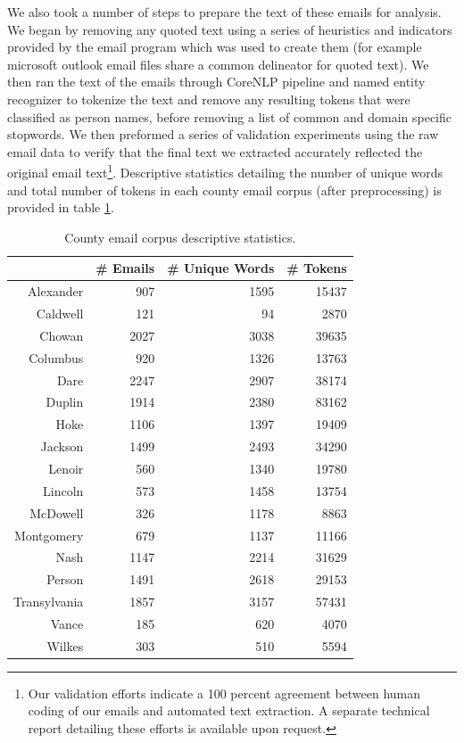 \documentclass{pnastwo}
\begin{document}
\begin{article}
We also took a number of steps to prepare the text of these emails for analysis. We began by removing any quoted text using a series of heuristics and indicators provided by the email program which was used to create them (for example microsoft outlook email files share a common delineator for quoted text). We then ran the text of the emails through CoreNLP pipeline and named entity recognizer \cite{manningetal2014} to tokenize the text and remove any resulting tokens that were classified as person names, before removing a list of common and domain specific stopwords. We then preformed a series of validation experiments using the raw email data to verify that the final text we extracted accurately reflected the original email text\footnote{Our validation efforts indicate a 100 percent agreement between human coding of our emails and automated text extraction. A separate technical report detailing these efforts is available upon request.}. Descriptive statistics detailing the number of unique words and total number of tokens in each county email corpus (after preprocessing) is provided in table \ref{tab:corpus desc stats}.  


\begin{table}
\centering
\begin{tabular}{rrrr}
  \toprule
 & \# Emails & \# Unique Words & \# Tokens  \\ 
  \midrule
Alexander & 907 & 1595 & 15437 \\ 
  Caldwell & 121 & 94 & 2870 \\ 
  Chowan & 2027 & 3038 & 39635  \\ 
  Columbus & 920 & 1326 & 13763  \\ 
  Dare & 2247 & 2907 & 38174  \\ 
  Duplin & 1914 & 2380 & 83162  \\ 
  Hoke & 1106 & 1397 & 19409 \\ 
  Jackson & 1499 & 2493 & 34290  \\ 
  Lenoir & 560 & 1340 & 19780  \\ 
  Lincoln & 573 & 1458 & 13754  \\ 
  McDowell & 326 & 1178 & 8863 \\ 
  Montgomery & 679 & 1137 & 11166  \\ 
  Nash & 1147 & 2214 & 31629  \\ 
  Person & 1491 & 2618 & 29153  \\
  Transylvania & 1857 & 3157 & 57431  \\ 
  Vance & 185 & 620 & 4070  \\ 
  Wilkes & 303 & 510 & 5594  \\
   \bottomrule
\end{tabular}
\caption{\label{tab:corpus desc stats} County email corpus descriptive statistics.}
\end{table}



\end{article}
\end{document}
